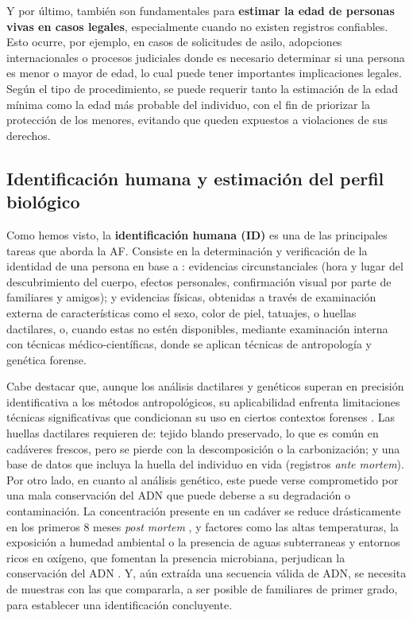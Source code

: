 Y por último, también son fundamentales para \textbf{estimar la edad de personas vivas en casos legales}, especialmente cuando no existen registros confiables. Esto ocurre, por ejemplo, en casos de solicitudes de asilo, adopciones internacionales o procesos judiciales donde es necesario determinar si una persona es menor o mayor de edad, lo cual puede tener importantes implicaciones legales. Según el tipo de procedimiento, se puede requerir tanto la estimación de la edad mínima como la edad más probable del individuo, con el fin de priorizar la protección de los menores, evitando que queden expuestos a violaciones de sus derechos.


\subsection{Identificación humana y estimación del perfil biológico}

Como hemos visto, la \textbf{identificación humana (ID)} es una de las principales tareas que aborda la AF. Consiste en la determinación y verificación de la identidad de una persona en base a \cite{thompson2006}: evidencias circunstanciales (hora y lugar del descubrimiento del cuerpo, efectos personales, confirmación visual por parte de familiares y amigos); y evidencias físicas, obtenidas a través de examinación externa de características como el sexo, color de piel, tatuajes, o huellas dactilares, o, cuando estas no estén disponibles, mediante examinación interna con técnicas médico-científicas, donde se aplican técnicas de antropología y genética forense.

Cabe destacar que, aunque los análisis dactilares y genéticos superan en precisión identificativa a los métodos antropológicos, su aplicabilidad enfrenta limitaciones técnicas significativas que condicionan su uso en ciertos contextos forenses \cite{beauthier2009}. Las huellas dactilares requieren de: tejido blando preservado, lo que es común en cadáveres frescos, pero se pierde con la descomposición o la carbonización; y una base de datos que incluya la huella del individuo en vida (registros \textit{ante mortem}). Por otro lado, en cuanto al análisis genético, este puede verse comprometido por una mala conservación del ADN que puede deberse a su degradación o contaminación. La concentración presente en un cadáver se reduce drásticamente en los primeros 8 meses \textit{post mortem} \cite{higgins2015}, y factores como las altas temperaturas, la exposición a humedad ambiental o la presencia de aguas subterraneas y entornos ricos en oxígeno, que fomentan la presencia microbiana, perjudican la conservación del ADN \cite{latham2018}. Y, aún extraída una secuencia válida de ADN, se necesita de muestras con las que compararla, a ser posible de familiares de primer grado, para establecer una identificación concluyente. 

